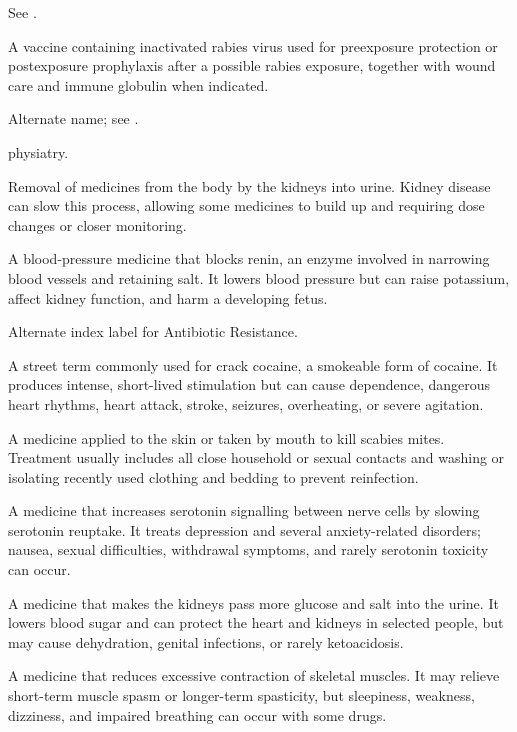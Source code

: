  See .


 A vaccine containing inactivated rabies virus used for preexposure protection or postexposure prophylaxis after a possible rabies exposure, together with wound care and immune globulin when indicated.

 Alternate name; see .

\synonyms
physiatry.

 Removal of medicines from the body by the kidneys into urine. Kidney disease can slow this process, allowing some medicines to build up and requiring dose changes or closer monitoring.

 A blood-pressure medicine that blocks renin, an enzyme involved in narrowing blood vessels and retaining salt. It lowers blood pressure but can raise potassium, affect kidney function, and harm a developing fetus.

 Alternate index label for Antibiotic Resistance.

 A street term commonly used for crack cocaine, a smokeable form of cocaine. It produces intense, short-lived stimulation but can cause dependence, dangerous heart rhythms, heart attack, stroke, seizures, overheating, or severe agitation.


 A medicine applied to the skin or taken by mouth to kill scabies mites. Treatment usually includes all close household or sexual contacts and washing or isolating recently used clothing and bedding to prevent reinfection.

 A medicine that increases serotonin signalling between nerve cells by slowing serotonin reuptake. It treats depression and several anxiety-related disorders; nausea, sexual difficulties, withdrawal symptoms, and rarely serotonin toxicity can occur.

 A medicine that makes the kidneys pass more glucose and salt into the urine. It lowers blood sugar and can protect the heart and kidneys in selected people, but may cause dehydration, genital infections, or rarely ketoacidosis.


 A medicine that reduces excessive contraction of skeletal muscles. It may relieve short-term muscle spasm or longer-term spasticity, but sleepiness, weakness, dizziness, and impaired breathing can occur with some drugs.

